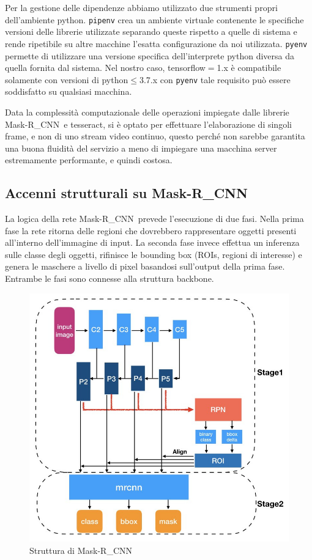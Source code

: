 \documentclass[12pt,a4paper]{article}
\newcommand{\mrcnn}{Mask-R\_CNN}
\begin{document}
Per la gestione delle dipendenze abbiamo utilizzato due strumenti propri
dell'ambiente python. \texttt{pipenv} crea un ambiente virtuale
contenente le specifiche versioni delle librerie utilizzate separando
queste rispetto a quelle di sistema e rende ripetibile su altre macchine
l'esatta configurazione da noi utilizzata. \texttt{pyenv} permette di
utilizzare una versione specifica dell'interprete python diversa da
quella fornita dal sistema. Nel nostro caso, tensorflow$=$1.x è
compatibile solamente con versioni di python$\leq$3.7.x con
\texttt{pyenv} tale requisito può essere soddisfatto su qualsiasi
macchina.

Data la complessità computazionale delle operazioni impiegate
dalle librerie \mrcnn\ e tesseract, si è optato per effettuare
l'elaborazione di singoli frame, e non di uno stream video
continuo, questo perché non sarebbe garantita una buona fluidità
del servizio a meno di impiegare una macchina server estremamente
performante, e quindi costosa.

\subsection{Accenni strutturali su \mrcnn}

La logica della rete \mrcnn\ prevede l'esecuzione di due fasi. Nella
prima fase la rete ritorna delle regioni che dovrebbero rappresentare
oggetti presenti all'interno dell'immagine di input. La seconda fase
invece effettua un inferenza sulle classe degli oggetti, rifinisce le
bounding box (ROIs, regioni di interesse) e genera le maschere a livello
di pixel basandosi sull'output della prima fase. Entrambe le fasi sono
connesse alla struttura backbone.

\begin{figure}[H]
    \caption{Struttura di \mrcnn}
    \centering
    \includegraphics[width=.88\textwidth]{mask_description.jpg}
\end{figure}
\end{document}
